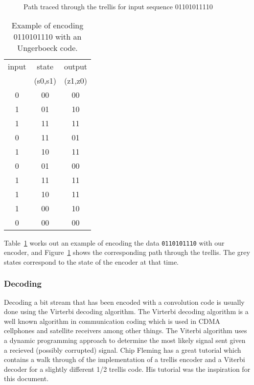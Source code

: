 \documentclass{article}
\begin{document}
\begin{figure}
\center
\epsfxsize=5.5in
\caption{Path traced through the trellis for input sequence 01101011110}
\label{fig:trellis-example}
\end{figure}

\begin{table}
\center
\begin{tabular}{c|c|c}
input & state   & output  \\
      & (s0,s1) & (z1,z0) \\
\hline
0 & 00 & 00 \\
1 & 01 & 10 \\
1 & 11 & 11 \\
0 & 11 & 01 \\
1 & 10 & 11 \\
0 & 01 & 00 \\
1 & 11 & 11 \\
1 & 10 & 11 \\
1 & 00 & 10 \\
0 & 00 & 00 \\
\end{tabular}
\caption{Example of encoding 0110101110 with an Ungerboeck code.}
\label{tbl:ungerboeck_example}
\end{table}

Table~\ref{tbl:ungerboeck_example} works out an example of encoding 
the data \texttt{0110101110} with our encoder,
and Figure~\ref{fig:trellis-example} shows the corresponding path through
the trellis. The grey states correspond to the state of the encoder 
at that time. 

\subsubsection{Decoding}

Decoding a bit stream that has been encoded with a convolution code is usually
done using the Virterbi decoding algorithm. The Virterbi decoding algorithm
is a well known algorithm in communication coding which is used in CDMA cellphones
and satellite receivers among other things. The Viterbi algorithm uses a dynamic programming
approach to determine the most likely signal sent given a recieved (possibly corrupted) signal. 
Chip Fleming has a great tutorial\cite{fleming:tutorial} which contains a walk 
through of the implementation of a trellis encoder and a Viterbi decoder 
for a slightly different 1/2 trellis code. His tutorial was the inspiration for this document.
\end{document}
